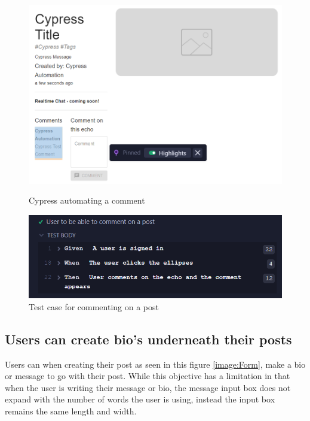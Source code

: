 \begin{figure}[ht]
\begin{minipage}[b]{0.4\linewidth}
    \centering
    \includegraphics[width=\linewidth]{images/CommentTest}
    \caption{Cypress automating a comment}
    \label{image:CommentTest}
\end{minipage}
    \hspace{0.5cm}
    \begin{minipage}[b]{0.4\linewidth}
    \centering
   \includegraphics[width=\linewidth]{images/CommentTestCase}
    \caption{Test case for commenting on a post}
    \label{image:CommentTestCase}
\end{minipage}
\end{figure}

\subsection{Users can create bio's underneath their posts}
Users can when creating their post as seen in this figure \ref{image:Form}, make a bio or message to go with their post. While this objective has a limitation in that when the user is writing their message or bio, the message input box does not expand with the number of words the user is using, instead the input box remains the same length and width.

